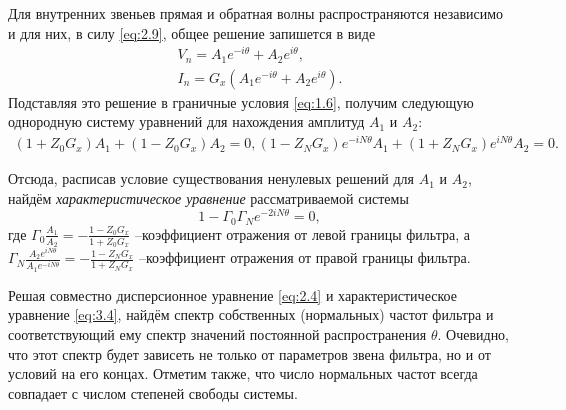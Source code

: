 Для внутренних звеньев прямая и обратная волны распространяются независимо и для них, в силу \eqref{eq:2.9}, общее решение запишется в виде
\begin{equation}
	\label{eq:3.2}
	\begin{gathered}
	V_n=A_1e^{-i\theta}+A_2e^{i\theta}, \\
	I_n=G_x(A_1e^{-i\theta}+A_2e^{i\theta}).
	\end{gathered}
\end{equation}
Подставляя это решение в граничные условия \eqref{eq:1.6},
получим следующую однородную систему уравнений для нахождения амплитуд $A_1$ и $A_2$:
\begin{equation}
	\label{eq:3.3}
	\begin{gathered}
	(1+Z_0G_x)A_1+(1-Z_0G_x)A_2=0,
	(1-Z_NG_x)e^{-iN\theta}A_1+(1+Z_NG_x)e^{iN\theta}A_2=0.
	\end{gathered}
\end{equation}

Отсюда, расписав условие существования ненулевых решений для $A_1$ и $A_2$, найдём \textit{характеристическое уравнение} рассматриваемой системы
\begin{equation}
\label{eq:3.4}
1-\Gamma_0\Gamma_Ne^{-2iN\theta}=0,
\end{equation}
где
$\displaystyle\Gamma_0\frac{A_1}{A_2}=-\frac{1-Z_0G_x}{1+Z_0G_x}$
--коэффициент отражения от левой границы фильтра, а
$\displaystyle\Gamma_N\frac{A_2e^{iN\theta}}{A_1e^{-iN\theta}}=
-\frac{1-Z_NG_x}{1+Z_NG_x}$
--коэффициент отражения от правой границы фильтра.

Решая совместно дисперсионное уравнение \eqref{eq:2.4} и характеристическое уравнение \eqref{eq:3.4}, найдём спектр собственных (нормальных) частот фильтра и соответствующий ему спектр значений постоянной распространения $\theta$. Очевидно, что этот спектр будет зависеть не только от параметров звена фильтра, но и от условий на его концах. Отметим также, что число нормальных частот всегда совпадает с числом степеней свободы системы.
